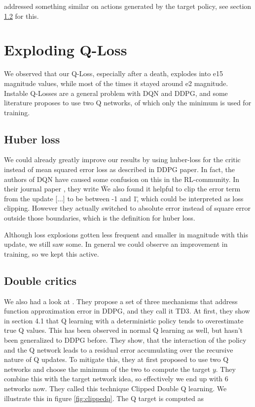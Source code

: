 \documentclass[hyperref,beleg]{cgvpub}
\begin{document}
\cite{fujimotoAddressingFunctionApproximation2018} addressed something similar on actions generated by the target policy, see section \ref{sec:double_critics} for this.

\section{Exploding Q-Loss}

We observed that our Q-Loss, especially after a death, explodes into e15 magnitude values, while most of the times it stayed around e2 magnitude. Instable Q-Losses are a general problem with DQN and DDPG, and some literature \cite{fujimotoAddressingFunctionApproximation2018} proposes to use two Q networks, of which only the minimum is used for training. 

\subsection{Huber loss}
We could already greatly improve our results by using huber-loss \cite{huber1964} for the critic instead of mean squared error loss as described in DDPG paper. In fact, the authors of \ac{DQN} have caused some confusion on this in the \ac{RL}-community. In their journal paper \cite{mnihHumanlevelControlDeep2015}, they write \"We also found it helpful to clip the error term from the update [...] to be between -1 and 1\", which could be interpreted as loss clipping. However they actually switched to absolute error instead of square error outside those boundaries, which is the definition for huber loss.

Although loss explosions gotten less frequent and smaller in magnitude with this update, we still saw some. In general we could observe an improvement in training, so we kept this active.

\subsection{Double critics}
\label{sec:double_critics}

We also had a look at \cite{fujimotoAddressingFunctionApproximation2018}. They propose a set of three mechanisms that address function approximation error in \ac{DDPG}, and they call it \ac{TD3}. At first, they show in section 4.1 that Q learning with a deterministic policy tends to overestimate true Q values. This has been observed in normal Q learning as well, but hasn't been generalized to \ac{DDPG} before. They show, that the interaction of the policy and the Q network leads to a residual error accumulating over the recursive nature of Q updates. To mitigate this, they at first proposed to use two Q networks and choose the minimum of the two to compute the target $y$. They combine this with the target network idea, so effectively we end up with 6 networks now. They called this technique Clipped Double Q learning. We illustrate this in figure \ref{fig:clippedq}. The Q target is computed as 
\end{document}
